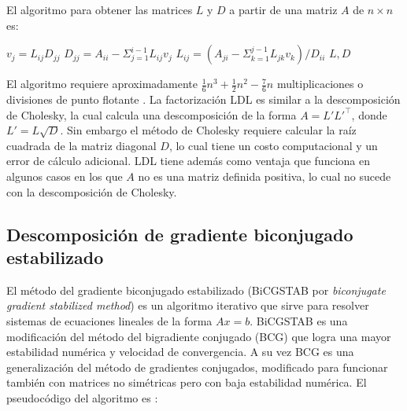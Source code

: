 El algoritmo para obtener las matrices $L$ y $D$ a partir de una matriz $A$ de $n \times n$ es:\\


\begin{algorithmic}
			\STATE $v_j = L_{ij} D_{jj}$
		\ENDFOR
		\STATE $D_{jj} = A_{ii} - \Sigma_{j=1}^{i-1} L_{ij} v_j$
			\STATE $L_{ij} = \left( A_{ji} - \Sigma_{k=1}^{j-1} L_{jk} v_k \right) / D_{ii}$
		\ENDFOR
	\ENDFOR
	\RETURN $L, D$
\end{algorithmic}

El algoritmo requiere aproximadamente $\frac{1}{6} n^3 + \frac{1}{2} n^2 - \frac{7}{6}n$
multiplicaciones o divisiones de punto flotante \cite{burden}. La factorización LDL es similar a la descomposición de Cholesky, la cual calcula una descomposición de la forma $A = L'L'^\intercal$, donde $L' = L\sqrt{D}$. Sin embargo el método de Cholesky requiere calcular la raíz cuadrada de la matriz diagonal $D$, lo cual tiene un costo computacional y un error de cálculo adicional. LDL tiene además como ventaja que funciona en algunos casos en los que $A$ no es una matriz definida positiva, lo cual no sucede con la descomposición de Cholesky.

\subsection*{Descomposición de gradiente biconjugado estabilizado}
El método del gradiente biconjugado estabilizado (BiCGSTAB por \textit{biconjugate gradient stabilized method}) es un algoritmo iterativo que sirve para resolver sistemas de ecuaciones lineales de la forma $Ax=b$. BiCGSTAB es una modificación del método del bigradiente conjugado (BCG) que logra una mayor estabilidad numérica y velocidad de convergencia. A su vez BCG es una generalización del método de gradientes conjugados, modificado para funcionar también con matrices no simétricas pero con baja estabilidad numérica. El pseudocódigo del algoritmo es \cite{yousef, fokkema}: 

\clearpage

\newcommand{\walfa}{\widetilde{\alpha}}
\newcommand{\wsigma}{\widetilde{\sigma}}
\newcommand{\wrcero}{\widetilde{r}_0}

